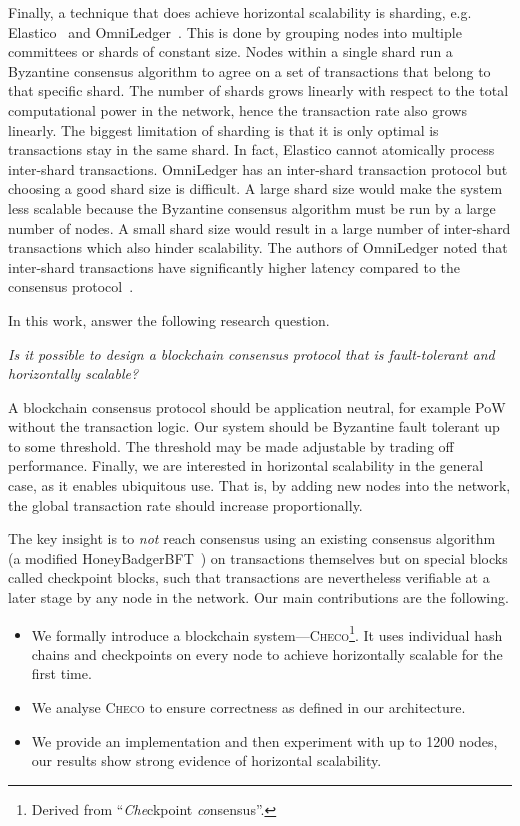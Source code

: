 Finally, a technique that does achieve horizontal scalability is sharding, e.g. Elastico~\cite{luu2016elastico} and OmniLedger~\cite{kokoris2017omniledger}.
This is done by grouping nodes into multiple committees or shards of constant size.
Nodes within a single shard run a Byzantine consensus algorithm to agree on a set of transactions that belong to that specific shard.
The number of shards grows linearly with respect to the total computational power in the network, hence the transaction rate also grows linearly.
The biggest limitation of sharding is that it is only optimal is transactions stay in the same shard.
In fact, Elastico cannot atomically process inter-shard transactions.
OmniLedger has an inter-shard transaction protocol but choosing a good shard size is difficult.
A large shard size would make the system less scalable because the Byzantine consensus algorithm must be run by a large number of nodes.
A small shard size would result in a large number of inter-shard transactions which also hinder scalability.
The authors of OmniLedger noted that inter-shard transactions have significantly higher latency compared to the consensus protocol~\cite{kokoris2017omniledger}.

In this work, answer the following research question.
\begin{displayquote}
\emph{Is it possible to design a blockchain consensus protocol that is fault-tolerant and horizontally scalable?}
\end{displayquote}
A blockchain consensus protocol should be application neutral,
for example PoW without the transaction logic.
Our system should be Byzantine fault tolerant up to some threshold.
The threshold may be made adjustable by trading off performance.
Finally, we are interested in horizontal scalability in the general case, as it enables ubiquitous use.
That is, by adding new nodes into the network, the global transaction rate should increase proportionally.

The key insight is to \emph{not} reach consensus using an existing consensus algorithm (a modified HoneyBadgerBFT~\cite{miller2016honey}) on transactions themselves but on special blocks called checkpoint blocks,
such that transactions are nevertheless verifiable at a later stage by any node in the network.
Our main contributions are the following.
\begin{itemize}
    \item We formally introduce a blockchain system---\textsc{Checo}\footnote{Derived from ``\emph{Che}ckpoint \emph{co}nsensus''.}.
        It uses individual hash chains and checkpoints on every node to achieve
        horizontally scalable for the first time.
    \item We analyse \textsc{Checo} to ensure correctness as defined in our architecture.
    \item We provide an implementation and then experiment with up to 1200 nodes,
        our results show strong evidence of horizontal scalability.
\end{itemize}

